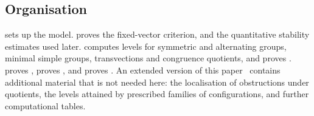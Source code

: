 \subsection*{Organisation}
 sets up the model.  proves the
fixed-vector criterion,  and the quantitative stability
estimates used later.  computes levels for symmetric
and alternating groups, minimal simple groups, transvections and
congruence quotients, and proves .
 proves , 
proves , and  proves
. An extended version of this paper~\cite{ZermenoExtended}
contains additional material that is not needed here: the localisation
of obstructions under quotients, the levels attained by prescribed
families of configurations, and further computational tables.
